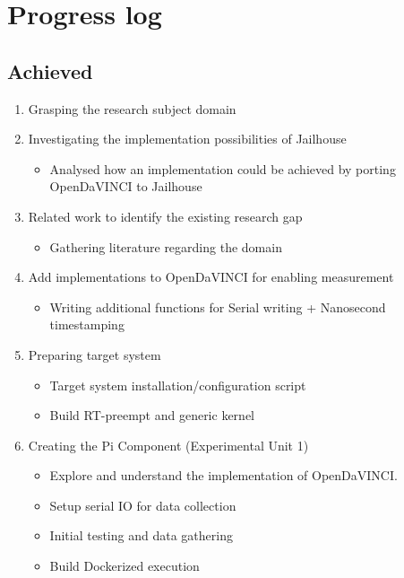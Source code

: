 \chapter{Progress log}

\section{Achieved}
\begin{enumerate}[label=\protect\circled{\arabic*}]
\itemsep0.5em
\item Grasping the research subject domain
\item Investigating the implementation possibilities of Jailhouse
	\begin{itemize}
		\item{Analysed how an implementation could be achieved by porting OpenDaVINCI to Jailhouse}
	\end{itemize}
\item Related work to identify the existing research gap
	\begin{itemize}
		\item{Gathering literature regarding the domain}
	\end{itemize}
\item Add implementations to OpenDaVINCI for enabling measurement
	\begin{itemize}
		\item{Writing additional functions for Serial writing + Nanosecond timestamping}
	\end{itemize}
\item Preparing target system
	\begin{itemize}
		\item{Target system installation/configuration script}
		\item{Build RT-preempt and generic kernel}
	\end{itemize}
\item Creating the Pi Component (Experimental Unit 1)
	\begin{itemize}
		\item{Explore and understand the implementation of OpenDaVINCI.}
		\item{Setup serial IO for data collection}
		\item{Initial testing and data gathering}
		\item{Build Dockerized execution}

\end{itemize}
\end{enumerate}

